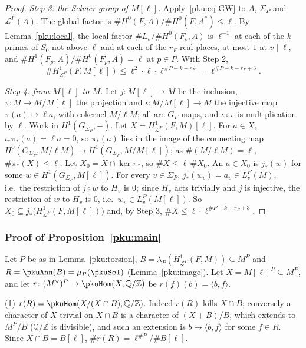 \documentclass[10pt]{amsart}
\theoremstyle{definition}
\theoremstyle{remark}
\newcommand{\Z}{\mathbb Z}
\newcommand{\Q}{\mathbb Q}
\begin{document}
\begin{proof}
\emph{Step 3: the Selmer group of $M[\ell]$.} Apply~\eqref{pku:eq-GW} to $A$, $\Sigma_P$ and
$\mathcal L^P(A)$. The global factor is $\#H^0(F,A)/\allowbreak \#H^0(F,A^*)\le\ell$. By
Lemma~\ref{pku:local}, the local factor $\#L_v/\#H^0(F_v,A)$ is $\ell^{-1}$ at each of the $k$ primes
of $S_0$ not above $\ell$ and at each of the $r_F$ real places, at most $1$ at $v\mid\ell$, and
$\#H^1(F_p,A)/\#H^0(F_p,A)=\ell$ at $p\in P$. With Step 2,
\[
\#H^1_{\mathcal L^P}(F,M[\ell])\le\ell^2\cdot\ell\cdot\ell^{\#P-k-r_F}=\ell^{\#P-k-r_F+3}.
\]

\emph{Step 4: from $M[\ell]$ to $M$.} Let $j\colon M[\ell]\to M$ be the inclusion, $\pi\colon M\to
M/M[\ell]$ the projection and $\iota\colon M/M[\ell]\to M$ the injective map $\pi(a)\mapsto\ell a$,
with cokernel $M/\ell M$; all are $G_F$-maps, and $\iota\circ\pi$ is multiplication by $\ell$. Work in
$H^1(G_{\Sigma_P},-)$. Let $X=H^1_{\mathcal L^P}(F,M)[\ell]$. For $a\in X$, $\iota_*\pi_*(a)=\ell a=0$,
so $\pi_*(a)$ lies in the image of the connecting map $H^0(G_{\Sigma_P},M/\ell M)\to H^1(G_{\Sigma_P},
M/M[\ell])$; as $\#(M/\ell M)=\ell$, $\#\pi_*(X)\le\ell$. Let $X_0=X\cap\ker\pi_*$, so $\#X\le\ell\,\#X_0$.
An $a\in X_0$ is $j_*(w)$ for some $w\in H^1(G_{\Sigma_P},M[\ell])$. For every $v\in\Sigma_P$,
$j_*(w_v)=a_v\in L^P_v(M)$, i.e.\ the restriction of $j\circ w$ to $H_v$ is $0$; since $H_v$ acts
trivially and $j$ is injective, the restriction of $w$ to $H_v$ is $0$, i.e.\ $w_v\in L^P_v(M[\ell])$.
So $X_0\subseteq j_*\bigl(H^1_{\mathcal L^P}(F,M[\ell])\bigr)$ and, by Step 3,
$\#X\le\ell\cdot\ell^{\#P-k-r_F+3}$.
\end{proof}

\subsubsection{Proof of Proposition~\ref{pku:main}}\label{pku:ss-proof}

Let $P$ be as in Lemma~\ref{pku:torsion}, $B=\lambda_P(H^1_{\mathcal L^P}(F,M))\subseteq M^P$ and $R=
\pkuAnn(B)=\mu_P(\pkuSel)$ (Lemma~\ref{pku:image}). Let $X=M[\ell]^P\subseteq M^P$, and let $r\colon
(M^\vee)^P\to\pkuHom(X,\Q/\Z)$ be $r(f)(b)=\langle b,f\rangle$.

(1) $r(R)=\pkuHom(X/(X\cap B),\Q/\Z)$. Indeed $r(R)$ kills $X\cap B$; conversely a character of $X$
trivial on $X\cap B$ is a character of $(X+B)/B$, which extends to $M^P/B$ ($\Q/\Z$ is divisible),
and such an extension is $b\mapsto\langle b,f\rangle$ for some $f\in R$. Since $X\cap B=B[\ell]$,
$\#r(R)=\ell^{\#P}/\#B[\ell]$.
\end{document}
